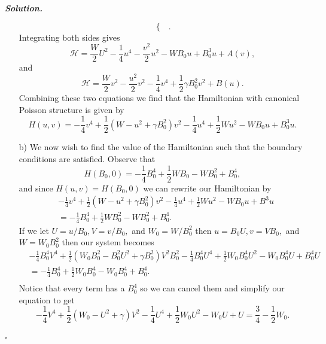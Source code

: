 \documentclass[12pt]{report}
\newenvironment{solution}[1][\it{Solution}]{\textbf{#1. } }{$\square$}
\newcommand{\paren}[1]{{\left(#1\right)}} %
\begin{document}
\begin{solution}
\begin{enumerate}
\[\begin{cases}
            \end{cases}.
        \]
        Integrating both sides gives
        \[ 
            \mathcal{H} = \frac{W}{2}U^2 - \frac{1}{4}u^4 - \frac{v^2}{2}u^2 - WB_0u + B_0^3u + A(v),
        \]
        and 
        \[ 
            \mathcal{H} = \frac{W}{2}v^2 - \frac{u^2}{2}v^2 - \frac{1}{4}v^4 + \frac{1}{2}\gamma B_0^2v^2 + B(u).
        \]
        Combining these two equations we find that the Hamiltonian with canonical Poisson structure is given by
        \[ 
            H(u,v) = -\frac{1}{4}v^4 + \frac{1}{2}\paren{W - u^2 + \gamma B_0^2}v^2 - \frac{1}{4}u^4 + \frac{1}{2}Wu^2 -WB_0u + B_0^3u.
        \]
        \item[b)]
        We now wish to find the value of the Hamiltonian such that the boundary conditions are satisfied. Observe that
        \[ 
            H(B_0,0)= - \frac{1}{4}B_0^4 + \frac{1}{2}WB_0 -WB_0^2 + B_0^4,
        \]
        and since $H(u,v) = H(B_0,0)$ we can rewrite our Hamiltonian by
        \begin{align*}
            &-\frac{1}{4}v^4 + \frac{1}{2}\paren{W-u^2 + \gamma B_0^2}v^2 - \frac{1}{4}u^4 + \frac{1}{2}Wu^2 - WB_0u+B^3u\\ &= - \frac{1}{4}B_0^4 + \frac{1}{2}WB_0^2 - WB_0^2 + B_0^4.
        \end{align*}
        If we let $U = u/B_0, V = v/B_0,$ and $W_0 = W/B_0^2$ then $u = B_0U, v = VB_0,$ and $W = W_0B_0^2$ then our system becomes
        \begin{align*}
            &-\frac{1}{4}B_0^4V^4 + \frac{1}{2}\paren{W_0B_0^2 - B_0^2U^2 + \gamma B_0^2}V^2B_0^2 - \frac{1}{4}B_0^4U^4 + \frac{1}{2}W_0B_0^4U^2 - W_0B_0^4U + B_0^4U\\ 
            &= - \frac{1}{4}B_0^4 + \frac{1}{2}W_0B_0^4 - W_0B_0^4 + B_0^4.\\
        \end{align*}
        Notice that every term has a $B_0^4$ so we can cancel them and simplify our equation to get
        \[
            -\frac{1}{4}V^4 + \frac{1}{2}(W_0 - U^2 + \gamma)V^2 - \frac{1}{4}U^4 + \frac{1}{2}W_0U^2 - W_0U + U = \frac{3}{4} - \frac{1}{2}W_0.    
        \]


\end{enumerate}
\end{solution}
\end{document}
